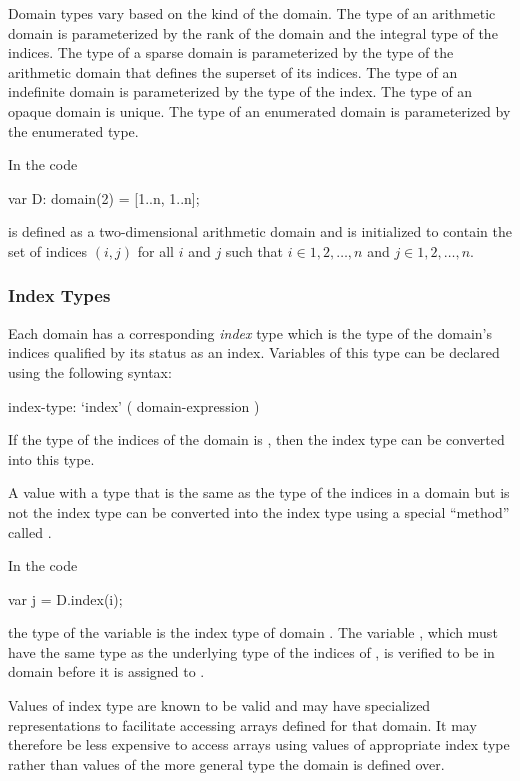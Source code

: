 Domain types vary based on the kind of the domain.  The type of an
arithmetic domain is parameterized by the rank of the domain and the
integral type of the indices.  The type of a sparse domain is
parameterized by the type of the arithmetic domain that defines the
superset of its indices.  The type of an indefinite domain is
parameterized by the type of the index.  The type of an opaque domain
is unique.  The type of an enumerated domain is parameterized by the
enumerated type.

\begin{example}
In the code
\begin{chapel}
var D: domain(2) = [1..n, 1..n];
\end{chapel}
 is defined as a two-dimensional arithmetic domain and is
initialized to contain the set of indices $(i,j)$ for all $i$ and $j$
such that $i \in {1, 2, \ldots, n}$ and $j \in {1, 2, \ldots, n}$.
\end{example}

\subsubsection{Index Types}
\label{Index_Types}

Each domain has a corresponding {\em index} type which is the type of
the domain's indices qualified by its status as an index.  Variables
of this type can be declared using the following syntax:
\begin{syntax}
index-type:
  `index' ( domain-expression )
\end{syntax}
If the type of the indices of the domain is , then the index
type can be converted into this type.

A value with a type that is the same as the type of the indices in a
domain but is not the index type can be converted into the index type
using a special ``method'' called .

\begin{example}
In the code
\begin{chapel}
var j = D.index(i);
\end{chapel}
the type of the variable  is the index type of
domain .  The variable , which must have the same type
as the underlying type of the indices of , is verified to be
in domain  before it is assigned to .
\end{example}

Values of index type are known to be valid and may have specialized
representations to facilitate accessing arrays defined for that
domain. It may therefore be less expensive to access arrays using
values of appropriate index type rather than values of the more
general type the domain is defined over.

